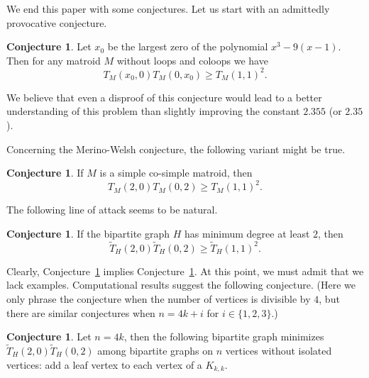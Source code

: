 \documentclass[12pt,a4paper]{amsart}
\numberwithin{equation}{section}
\theoremstyle{plain}
\theoremstyle{definition}
\newtheorem{Conj}[Th]{Conjecture}
\newcommand{\1}{\textbf{1}}
\newcommand{\wT}{\widetilde{T}}
\begin{document}
We end this paper with some conjectures. Let us start with an admittedly provocative conjecture.

\begin{Conj} \label{provocation}
Let $x_0$ be the largest zero of the polynomial $x^3-9(x-1)$. Then for any matroid $M$ without loops and coloops we have
$$T_M(x_0,0)T_M(0,x_0)\geq T_M(1,1)^2.$$
\end{Conj}

We believe that even a disproof of this conjecture would lead to a better understanding of this problem than slightly improving the constant $2.355$ (or $2.35$).

Concerning the Merino-Welsh conjecture, the following variant might be true.

\begin{Conj} \label{simple-cosimple}
If $M$ is a simple co-simple matroid, then
$$T_M(2,0)T_M(0,2)\geqslant T_M(1,1)^2.$$
\end{Conj}

The following line of attack seems to be natural.

\begin{Conj} \label{degree-2}
If the bipartite graph $H$ has minimum degree at least $2$, then
$$\wT_H(2,0)\wT_H(0,2)\geqslant\wT_H(1,1)^2.$$
\end{Conj}

Clearly, Conjecture~\ref{degree-2} implies Conjecture~\ref{simple-cosimple}. At this point, we must admit that we lack examples.  Computational results suggest the following conjecture. (Here we only phrase the conjecture when the number of vertices is divisible by $4$, but there are similar conjectures when $n=4k+i$ for $i\in \{1,2,3\}$.)

\begin{Conj} 
Let $n=4k$, then the following bipartite graph minimizes $\wT_H(2,0)\wT_H(0,2)$ among bipartite graphs on $n$ vertices without isolated vertices: add a leaf vertex to each vertex of a $K_{k,k}$. 
\end{Conj}
\end{document}
